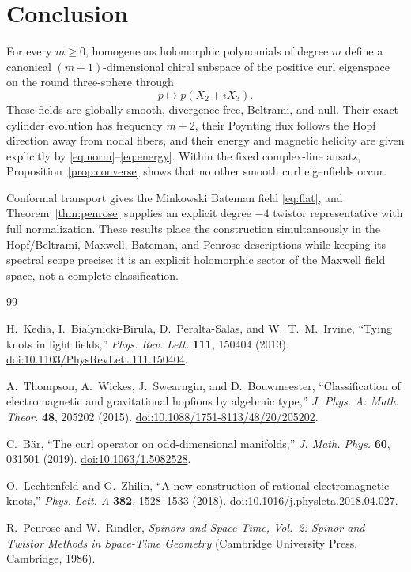 \documentclass[11pt,a4paper]{article}
\numberwithin{equation}{section}
\theoremstyle{remark}
\begin{document}
\section{Conclusion}

For every \(m\ge0\), homogeneous holomorphic polynomials of degree \(m\) define a canonical \((m+1)\)-dimensional chiral subspace of the positive curl eigenspace on the round three-sphere through
\[
 p\longmapsto p(X_2+iX_3).
\]
These fields are globally smooth, divergence free, Beltrami, and null. Their exact cylinder evolution has frequency \(m+2\), their Poynting flux follows the Hopf direction away from nodal fibers, and their energy and magnetic helicity are given explicitly by \eqref{eq:norm}--\eqref{eq:energy}. Within the fixed complex-line ansatz, Proposition~\ref{prop:converse} shows that no other smooth curl eigenfields occur.

Conformal transport gives the Minkowski Bateman field \eqref{eq:flat}, and Theorem~\ref{thm:penrose} supplies an explicit degree \(-4\) twistor representative with full normalization. These results place the construction simultaneously in the Hopf/Beltrami, Maxwell, Bateman, and Penrose descriptions while keeping its spectral scope precise: it is an explicit holomorphic sector of the Maxwell field space, not a complete classification.

\begin{thebibliography}{99}

H.~Kedia, I.~Bialynicki-Birula, D.~Peralta-Salas, and W.~T.~M.~Irvine,
``Tying knots in light fields,''
\emph{Phys. Rev. Lett.} \textbf{111}, 150404 (2013).
\href{https://doi.org/10.1103/PhysRevLett.111.150404}{doi:10.1103/PhysRevLett.111.150404}.

A.~Thompson, A.~Wickes, J.~Swearngin, and D.~Bouwmeester,
``Classification of electromagnetic and gravitational hopfions by algebraic type,''
\emph{J. Phys. A: Math. Theor.} \textbf{48}, 205202 (2015).
\href{https://doi.org/10.1088/1751-8113/48/20/205202}{doi:10.1088/1751-8113/48/20/205202}.

C.~B\"ar,
``The curl operator on odd-dimensional manifolds,''
\emph{J. Math. Phys.} \textbf{60}, 031501 (2019).
\href{https://doi.org/10.1063/1.5082528}{doi:10.1063/1.5082528}.

O.~Lechtenfeld and G.~Zhilin,
``A new construction of rational electromagnetic knots,''
\emph{Phys. Lett. A} \textbf{382}, 1528--1533 (2018).
\href{https://doi.org/10.1016/j.physleta.2018.04.027}{doi:10.1016/j.physleta.2018.04.027}.

R.~Penrose and W.~Rindler,
\emph{Spinors and Space-Time, Vol.~2: Spinor and Twistor Methods in Space-Time Geometry}
(Cambridge University Press, Cambridge, 1986).

\end{thebibliography}
\end{document}

